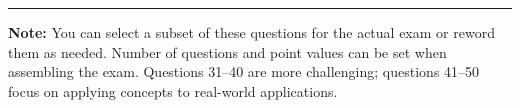 \documentclass[11pt]{article}
\begin{document}
\bigskip
\hrule
\bigskip

\noindent \textbf{Note:} You can select a subset of these questions for the actual exam or reword them as needed. Number of questions and point values can be set when assembling the exam. Questions 31--40 are more challenging; questions 41--50 focus on applying concepts to real-world applications.
\end{document}
